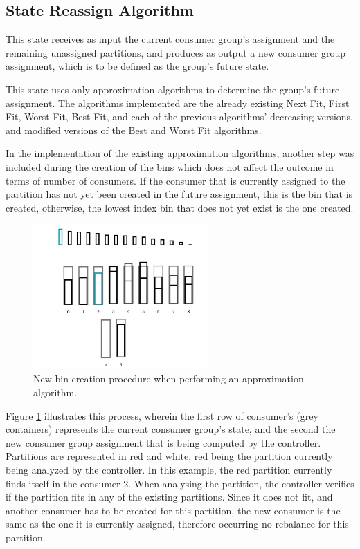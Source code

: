 \subsection{State Reassign Algorithm}

This state receives as input the current consumer group's assignment and the
remaining unassigned partitions, and produces as output a new consumer group
assignment, which is to be defined as the group's future state.

This state uses only approximation algorithms to determine the group's future
assignment. The algorithms implemented are the already existing Next Fit, First
Fit, Worst Fit, Best Fit, and each of the previous algorithms' decreasing
versions, and modified versions of the Best and Worst Fit algorithms. 

In the implementation of the existing approximation algorithms, another step was
included during the creation of the bins which does not affect the outcome in
terms of number of consumers. If the consumer that is currently assigned to the
partition has not yet been created in the future assignment, this is the bin
that is created, otherwise, the lowest index bin that does not yet exist is the
one created.
 
\begin{figure}[H] \centering
\includegraphics[width=0.6\textwidth]{images/controller/ApproximationAlgorithm_NewBin.png}
\caption{New bin creation procedure when performing an approximation algorithm.}
\label{fig:approximation_bin_creation} \end{figure}

Figure \ref{fig:approximation_bin_creation} illustrates this process, wherein
the first row of consumer's (grey containers) represents the current consumer
group's state, and the second the new consumer group assignment that is being
computed by the controller. Partitions are represented in red and white, red
being the partition currently being analyzed by the controller. In this example,
the red partition currently finds itself in the consumer 2. When analysing the
partition, the controller verifies if the partition fits in any of the existing
partitions. Since it does not fit, and another consumer has to be created for
this partition, the new consumer is the same as the one it is currently
assigned, therefore occurring no rebalance for this partition.

